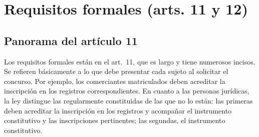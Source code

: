 \documentclass[12pt,oneside]{book}
\begin{document}
\section{Requisitos formales (arts. 11 y 12)}

\subsection{Panorama del artículo 11}

Los requisitos formales están en el art.~11, que es largo y tiene numerosos incisos. Se refieren básicamente a lo que debe presentar cada sujeto al solicitar el concurso. Por ejemplo, los comerciantes matriculados deben acreditar la inscripción en los registros correspondientes. En cuanto a las personas jurídicas, la ley distingue las regularmente constituidas de las que no lo están: las primeras deben acreditar la inscripción en los registros y acompañar el instrumento constitutivo y las inscripciones pertinentes; las segundas, el instrumento constitutivo.
\end{document}
